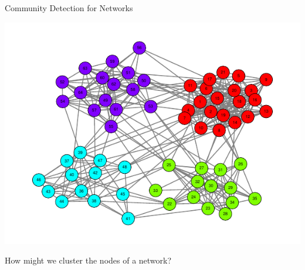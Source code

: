 \documentclass[
  ignorenonframetext,
]{beamer}
\begin{document}
\begin{frame}{Community Detection for Networks}
\protect\hypertarget{community-detection-for-networks}{}
\newcommand{\diag}{\text{diag}}
\newcommand{\tr}{\text{Tr}}
\newcommand{\blockdiag}{\text{blockdiag}}
\newcommand{\indep}{\stackrel{\text{ind}}{\sim}}
\newcommand{\iid}{\stackrel{\text{iid}}{\sim}}
\newcommand{\Bernoulli}{\text{Bernoulli}}
\newcommand{\Betadist}{\text{Beta}}
\newcommand{\BG}{\text{BernoulliGraph}}
\newcommand{\Categorical}{\text{Categorical}}
\newcommand{\Uniform}{\text{Uniform}}
\newcommand{\RDPG}{\text{RDPG}}
\newcommand{\GRDPG}{\text{GRDPG}}
\newcommand{\PABM}{\text{PABM}}

\begin{center}\includegraphics[width=0.5\linewidth]{slides_files/figure-beamer/unnamed-chunk-4-1} \end{center}

\begin{center}

How might we cluster the nodes of a network?

\end{center}
\end{frame}
\end{document}
